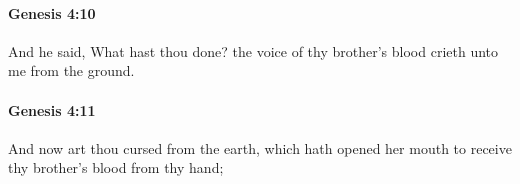 		\paragraph{Genesis 4:10} %
			\label{GENESIS-4-10}

			And he said, What hast thou done? the voice of thy brother's blood crieth unto me from the ground.


		\paragraph{Genesis 4:11} %
			\label{GENESIS-4-11}

			And now art thou cursed from the earth, which hath opened her mouth to receive thy brother's blood from thy hand;


